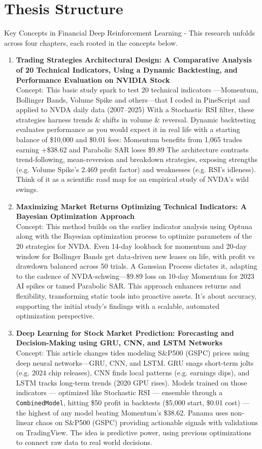 \section{Thesis Structure}
Key Concepts in Financial Deep Reinforcement Learning - This research unfolds across four chapters, each rooted in the concepts below.
\begin{enumerate}
    \item \textbf{Trading Strategies Architectural Design: A Comparative Analysis of 20 Technical Indicators, Using a Dynamic Backtesting, and Performance Evaluation on NVIDIA Stock} \\
    Concept: This basic study spark to test 20 technical indicators —Momentum, Bollinger Bands, Volume Spike and others—that I coded in PineScript and applied to NVDA daily data (2007–2025) With a Stochastic RSI filter, these strategies harness trends \& shifts in volume \& reversal. Dynamic backtesting evaluates performance as you would expect it in real life with a starting balance of \$10,000 and \$0.01 fees: Momentum benefits from 1,065 trades earning +\$38.62 and Parabolic SAR loses \$9.89 The architecture contrasts trend-following, mean-reversion and breakdown strategies, exposing strengths (e.g. Volume Spike’s 2.469 profit factor) and weaknesses (e.g. RSI’s idleness). Think of it as a scientific road map for an empirical study of NVDA’s wild swings.

    \item \textbf{Maximizing Market Returns Optimizing Technical Indicators: A Bayesian Optimization Approach} \\
    Concept: This method builds on the earlier indicator analysis using Optuna along with the Bayesian optimization process to optimize parameters of the 20 strategies for NVDA. Even 14-day lookback for momentum and 20-day window for Bollinger Bands get data-driven new leases on life, with profit vs drawdown balanced across 50 trials. A Gaussian Process dictates it, adapting to the cadence of NVDA-schwing—\$9.89 loss on 10-day Momentum for 2023 AI spikes or tamed Parabolic SAR. This approach enhances returns and flexibility, transforming static tools into proactive assets. It’s about accuracy, supporting the initial study’s findings with a scalable, automated optimization perspective.

    \item \textbf{Deep Learning for Stock Market Prediction: Forecasting and Decision-Making using GRU, CNN, and LSTM Networks} \\
    Concept: This article changes tides modeling S\&P500 (GSPC) prices using deep neural networks—GRU, CNN, and LSTM. GRU snags short-term jolts (e.g. 2024 chip releases), CNN finds local patterns (e.g. earnings dips), and LSTM tracks long-term trends (2020 GPU rises). Models trained on those indicators — optimized like Stochastic RSI — ensemble through a \texttt{CombinedModel}, hitting \$50 profit in backtests (\$5,000 start, \$0.01 cost) — the highest of any model beating Momentum’s \$38.62. Panama uses non-linear chaos on S\&P500 (GSPC) providing actionable signals with validations on TradingView. The idea is predictive power, using previous optimizations to connect raw data to real world decisions.
    

\end{enumerate}
